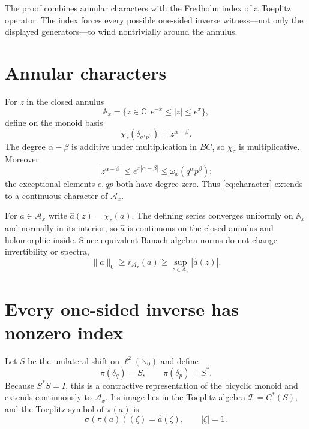 \documentclass[11pt]{article}
\newcommand{\A}{\mathcal A}
\newcommand{\T}{\mathcal T}
\begin{document}
The proof combines annular characters with the Fredholm index of a Toeplitz
operator.  The index forces every possible one-sided inverse witness---not
only the displayed generators---to wind nontrivially around the annulus.

\section{Annular characters}

For $z$ in the closed annulus
\[
       \mathbb A_x=\{z\in\mathbb C:e^{-x}\le|z|\le e^x\},
\]
define on the monoid basis
\begin{equation}\label{eq:character}
 \chi_z(\delta_{q^\alpha p^\beta})=z^{\alpha-\beta}.
\end{equation}
The degree $\alpha-\beta$ is additive under multiplication in $BC$, so
$\chi_z$ is multiplicative.  Moreover
\[
 |z^{\alpha-\beta}|
 \le e^{x|\alpha-\beta|}
 \le\omega_x(q^\alpha p^\beta);
\]
the exceptional elements $e,qp$ both have degree zero.  Thus \eqref{eq:character}
extends to a continuous character of $\A_x$.

For $a\in\A_x$ write $\widehat a(z)=\chi_z(a)$.  The defining series converges
uniformly on $\mathbb A_x$ and normally in its interior, so $\widehat a$ is
continuous on the closed annulus and holomorphic inside.  Since equivalent
Banach-algebra norms do not change invertibility or spectra,
\begin{equation}\label{eq:spectral}
 \|a\|_0\ge r_{\A_x}(a)\ge
 \sup_{z\in\mathbb A_x}|\widehat a(z)|.
\end{equation}

\section{Every one-sided inverse has nonzero index}

Let $S$ be the unilateral shift on $\ell^2(\mathbb N_0)$ and define
\begin{equation}\label{eq:toeplitzrep}
 \pi(\delta_q)=S,\qquad \pi(\delta_p)=S^*.
\end{equation}
Because $S^*S=I$, this is a contractive representation of the bicyclic monoid
and extends continuously to $\A_x$.  Its image lies in the Toeplitz algebra
$\T=C^*(S)$, and the Toeplitz symbol of $\pi(a)$ is
\begin{equation}\label{eq:symbol}
             \sigma(\pi(a))(\zeta)=\widehat a(\zeta),
             \qquad |\zeta|=1.
\end{equation}
\end{document}
